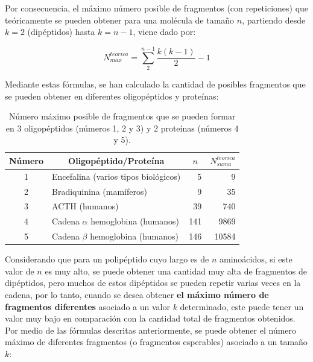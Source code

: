 Por consecuencia, el máximo número posible de fragmentos (con repeticiones) que teóricamente se pueden obtener para una molécula de tamaño $n$, partiendo desde $k=2$ (dipéptidos) hasta $k=n-1$, viene dado por:

\begin{equation}
N_{max}^{teorica}=\sum_{2}^{n-1} \frac{k(k-1)}{2}-1
\end{equation}

Mediante estas fórmulas, se han calculado la cantidad de posibles fragmentos que se pueden obtener en diferentes oligopéptidos y proteínas:

\begin{table}[H]
\centering
\label{my-label3}
\begin{tabular}{|c|l|r|r|}
\hline
Número & \multicolumn{1}{c|}{Oligopéptido/Proteína} & \multicolumn{1}{c|}{$n$} & \multicolumn{1}{c|}{$N_{suma}^{teorica}$} \\ \hline
1      & Encefalina (varios tipos biológicos)       & 5                        & 9                     \\
2      & Bradiquinina (mamíferos)                   & 9                        & 35                    \\
3      & ACTH (humanos)                             & 39                       & 740                   \\
4      & Cadena $\alpha$ hemoglobina (humanos)          & 141                      & 9869                  \\
5      & Cadena $\beta$ hemoglobina (humanos)          & 146                      & 10584                 \\ \hline
\end{tabular}
\caption{Número máximo posible de fragmentos que se pueden formar en 3 oligopéptidos (números 1, 2 y 3) y 2 proteínas (números 4 y 5).}
\end{table}

Considerando que para un polipéptido cuyo largo es de $n$ aminoácidos, si este valor de $n$ es muy alto, se puede obtener una cantidad muy alta de fragmentos de dipéptidos, pero muchos de estos dipéptidos se pueden repetir varias veces en la cadena, por lo tanto, cuando se desea obtener {\bf{el máximo número de fragmentos diferentes}} asociado a un valor $k$ determinado, este puede tener un valor muy bajo en comparación con la cantidad total de fragmentos obtenidos. Por medio de las fórmulas descritas anteriormente, se puede obtener el número máximo de diferentes fragmentos (o fragmentos esperables) asociado a un tamaño $k$:


